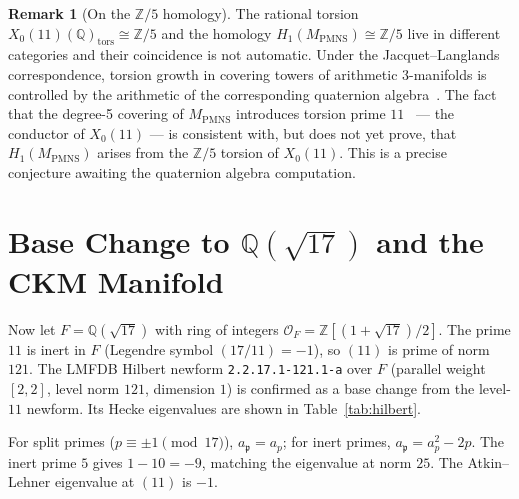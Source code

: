 \documentclass[11pt,a4paper]{article}
\theoremstyle{definition}
\newtheorem{remark}[theorem]{Remark}
\newcommand{\QQ}{\mathbb{Q}}
\newcommand{\ZZ}{\mathbb{Z}}
\newcommand{\MPMNS}{M_{\mathrm{PMNS}}}
\begin{document}
\begin{remark}[On the $\ZZ/5$ homology]
The rational torsion $X_0(11)(\QQ)_{\mathrm{tors}} \cong \ZZ/5$ and
the homology $H_1(\MPMNS) \cong \ZZ/5$ live in different categories
and their coincidence is not automatic.
Under the Jacquet--Langlands correspondence, torsion growth in
covering towers of arithmetic 3-manifolds is controlled by the
arithmetic of the corresponding quaternion algebra~\cite{MaclachlanReid}.
The fact that the degree-5 covering of $\MPMNS$ introduces torsion
prime $11$~\cite{Gentry:FareyTower} — the conductor of $X_0(11)$
— is consistent with, but does not yet prove, that $H_1(\MPMNS)$
arises from the $\ZZ/5$ torsion of $X_0(11)$.
This is a precise conjecture awaiting the quaternion algebra computation.
\end{remark}

\section{Base Change to $\QQ(\sqrt{17})$ and the CKM Manifold}
\label{sec:hilbert}

Now let $F = \QQ(\sqrt{17})$ with ring of integers
$\mathcal{O}_F = \ZZ[(1+\sqrt{17})/2]$.
The prime $11$ is inert in $F$ (Legendre symbol $(17/11) = -1$),
so $(11)$ is prime of norm $121$.
The LMFDB Hilbert newform \texttt{2.2.17.1-121.1-a} over $F$
(parallel weight $[2,2]$, level norm $121$, dimension $1$)
is confirmed as a base change from the level-$11$ newform.
Its Hecke eigenvalues are shown in Table~\ref{tab:hilbert}.

For split primes ($p \equiv \pm 1 \pmod{17}$),
$a_{\mathfrak{p}} = a_p$;
for inert primes,
$a_{\mathfrak{p}} = a_p^2 - 2p$.
The inert prime $5$ gives
$1 - 10 = -9$, matching the eigenvalue at norm $25$.
The Atkin--Lehner eigenvalue at $(11)$ is $-1$.
\end{document}
